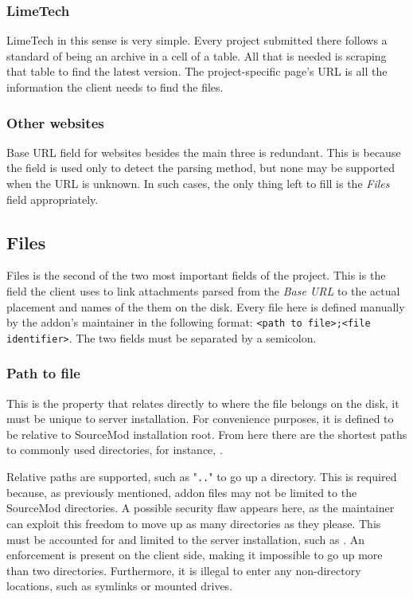 \subsubsection{LimeTech}

LimeTech in this sense is very simple.
Every project submitted there follows a standard of being an archive in a cell of a table.
All that is needed is scraping that table to find the latest version.
The project-specific page's URL is all the information the client needs to find the files.

\subsubsection{Other websites}

Base URL field for websites besides the main three is redundant.
This is because the field is used only to detect the parsing method, but none may be supported when the URL is unknown.
In such cases, the only thing left to fill is the \textit{Files} field appropriately.

\subsection{Files}

Files is the second of the two most important fields of the project.
This is the field the client uses to link attachments parsed from the \textit{Base URL} to the actual placement and names of the them on the disk.
Every file here is defined manually by the addon's maintainer in the following format: \verb|<path to file>;<file identifier>|.
The two fields must be separated by a semicolon.

\subsubsection{Path to file}

This is the property that relates directly to where the file belongs on the disk, it must be unique to server installation.
For convenience purposes, it is defined to be relative to SourceMod installation root.
From here there are the shortest paths to commonly used directories, for instance, .

Relative paths are supported, such as "\verb|..|" to go up a directory.
This is required because, as previously mentioned, addon files may not be limited to the SourceMod directories.
A possible security flaw appears here, as the maintainer can exploit this freedom to move up as many directories as they please.
This must be accounted for and limited to the server installation, such as .
An enforcement is present on the client side, making it impossible to go up more than two directories.
Furthermore, it is illegal to enter any non-directory locations, such as symlinks or mounted drives.

